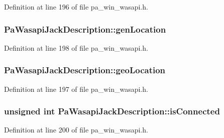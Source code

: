 Definition at line 196 of file pa\+\_\+win\+\_\+wasapi.\+h.

\subsubsection[{\texorpdfstring{gen\+Location}{genLocation}}]{ Pa\+Wasapi\+Jack\+Description\+::gen\+Location}\hypertarget{struct_pa_wasapi_jack_description_a852b2bcb200801d995b4b250bb0bad6c}{}\label{struct_pa_wasapi_jack_description_a852b2bcb200801d995b4b250bb0bad6c}


Definition at line 198 of file pa\+\_\+win\+\_\+wasapi.\+h.

\subsubsection[{\texorpdfstring{geo\+Location}{geoLocation}}]{ Pa\+Wasapi\+Jack\+Description\+::geo\+Location}\hypertarget{struct_pa_wasapi_jack_description_aed082cc704160dc568aec7da9b778328}{}\label{struct_pa_wasapi_jack_description_aed082cc704160dc568aec7da9b778328}


Definition at line 197 of file pa\+\_\+win\+\_\+wasapi.\+h.

\subsubsection[{\texorpdfstring{is\+Connected}{isConnected}}]{\setlength{\rightskip}{0pt plus 5cm}unsigned {\bf int} Pa\+Wasapi\+Jack\+Description\+::is\+Connected}\hypertarget{struct_pa_wasapi_jack_description_a76f80f4664be933cc4d760b37d1ff410}{}\label{struct_pa_wasapi_jack_description_a76f80f4664be933cc4d760b37d1ff410}


Definition at line 200 of file pa\+\_\+win\+\_\+wasapi.\+h.

